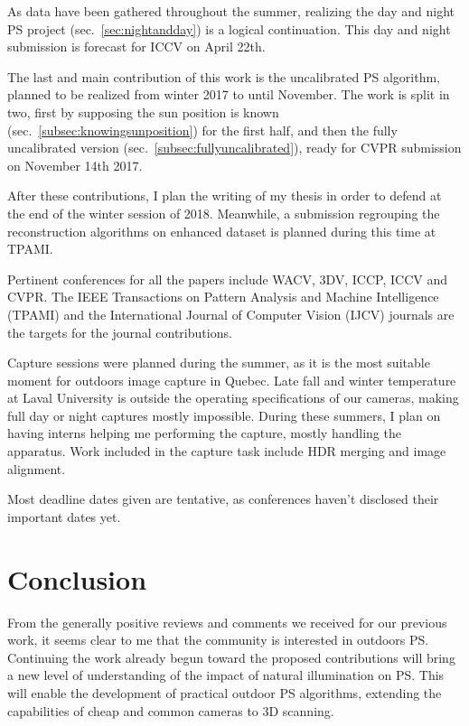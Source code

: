 \documentclass{report}
\begin{document}
As data have been gathered throughout the summer, realizing the day and night PS project (sec.~\ref{sec:nightandday}) is a logical continuation. This day and night submission is forecast for ICCV on April 22th.

The last and main contribution of this work is the uncalibrated PS algorithm, planned to be realized from winter 2017 to until November. The work is split in two, first by supposing the sun position is known (sec.~\ref{subsec:knowingsunposition}) for the first half, and then the fully uncalibrated version (sec.~\ref{subsec:fullyuncalibrated}), ready for CVPR submission on November 14th 2017.

After these contributions, I plan the writing of my thesis in order to defend at the end of the winter session of 2018. Meanwhile, a submission regrouping the reconstruction algorithms on enhanced dataset is planned during this time at TPAMI.

Pertinent conferences for all the papers include WACV, 3DV, ICCP, ICCV and CVPR. The IEEE Transactions on Pattern Analysis and Machine Intelligence (TPAMI) and the International Journal of Computer Vision (IJCV) journals are the targets for the journal contributions.

Capture sessions were planned during the summer, as it is the most suitable moment for outdoors image capture in Quebec. Late fall and winter temperature at Laval University is outside the operating specifications of our cameras, making full day or night captures mostly impossible. During these summers, I plan on having interns helping me performing the capture, mostly handling the apparatus. Work included in the capture task include HDR merging and image alignment.

Most deadline dates given are tentative, as conferences haven't disclosed their important dates yet.


\chapter{Conclusion}\label{conclusion}

From the generally positive reviews and comments we received for our previous work, it seems clear to me that the community is interested in outdoors PS. Continuing the work already begun toward the proposed contributions will bring a new level of understanding of the impact of natural illumination on PS. This will enable the development of practical outdoor PS algorithms, extending the capabilities of cheap and common cameras to 3D scanning.
\end{document}
